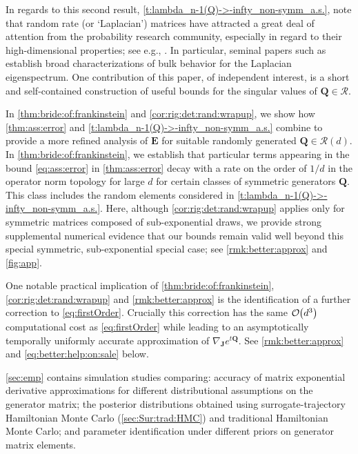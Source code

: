 \documentclass[9pt,twocolumn,twoside]{pnas-new}
\newcommand{\order}[1]{{\cal O}\hspace{-0.2em}\left( #1 \right)}
\newcommand{\?}{\textbf{?}}
\newcommand{\E}{{\mathbf{ E}}}
\newcommand{\QQ}{\mathbf{Q}}
\newcommand{\JJ}{\mathbf{J}}
\begin{document}
In regards to this second result,
\cref{t:lambda_n-1(Q)->-infty_non-symm_a.s.}, note that random rate (or
`Laplacian') matrices have attracted a great deal of attention from the
probability research community, especially in regard to their
high-dimensional properties; see e.g., \cite{takahashi:1969,bai:1999,
  chafai:2010, bordenave:caputo:chafai:2012, chatterjee:hazra:2022,
  nakerst:denisov:haque:2023}. In particular, seminal papers such as
\cite{bryc:dembo:jiang:2006, ding:jiang:2010,
  bordenave:caputo:chafai:2014} establish broad characterizations of
bulk behavior for the Laplacian eigenspectrum.  One contribution of
this paper, of independent interest, is a short and self-contained
construction of useful bounds for the singular values of
$\QQ \in \mathcal{R}$.

In \cref{thm:bride:of:frankinstein} and
\cref{cor:rig:det:rand:wrapup}, we show how \cref{thm:ass:error} and
\cref{t:lambda_n-1(Q)->-infty_non-symm_a.s.} combine to provide a more
refined analysis of $\E$ for suitable randomly generated
$\QQ \in \mathcal{R}(d)$. In \cref{thm:bride:of:frankinstein}, we
establish that particular terms appearing in the bound
\eqref{eq:ass:error} in \cref{thm:ass:error} decay with a rate on the
order of $1/d$ in the operator norm topology for large $d$ for certain
classes of symmetric generators $\QQ$. This class includes the random
elements considered in \cref{t:lambda_n-1(Q)->-infty_non-symm_a.s.}.
Here, although \cref{cor:rig:det:rand:wrapup} applies only for
symmetric matrices composed of sub-exponential draws, we provide
strong supplemental numerical evidence that our bounds remain valid
well beyond this special symmetric, sub-exponential special case; see
\cref{rmk:better:approx} and \cref{fig:app}.

One notable practical implication of \cref{thm:bride:of:frankinstein},
\cref{cor:rig:det:rand:wrapup} and \cref{rmk:better:approx} is the
identification of a further correction to
\eqref{eq:firstOrder}. Crucially this correction has the same
$\order{d^3}$ computational cost as \eqref{eq:firstOrder} while
leading to an asymptotically temporally uniformly accurate
approximation of $\nabla_{\JJ} e^{t \QQ}$.  See
\cref{rmk:better:approx} and \eqref{eq:better:help:on:sale} below.

 \cref{sec:emp} contains simulation studies comparing: accuracy of matrix exponential derivative approximations for different distributional assumptions on the generator matrix; the posterior distributions obtained using surrogate-trajectory Hamiltonian Monte Carlo (\cref{sec:Sur:trad:HMC}) and traditional Hamiltonian Monte Carlo; and parameter identification under different priors on generator matrix elements.
\end{document}
